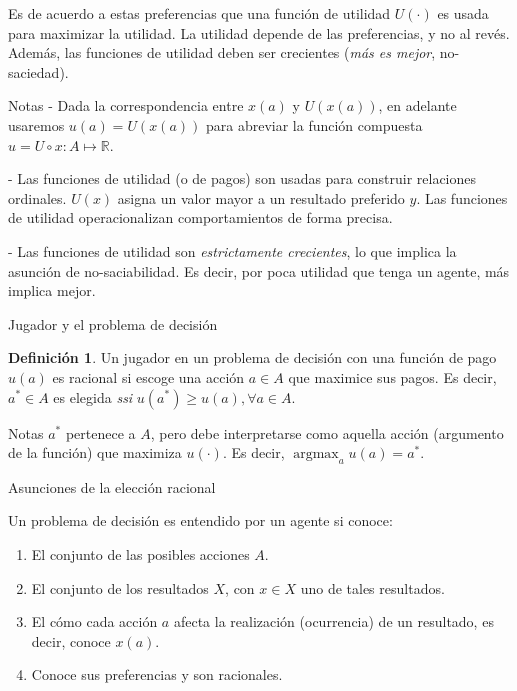 \documentclass[12pt]{scrartcl}
\theoremstyle{definition}
\newtheorem{defi}{Definición}[section]
\DeclareMathOperator*{\argmax}{argmax}
\newenvironment{myenum}
{ \begin{enumerate}
		\setlength{\itemsep}{0pt}
		\setlength{\parskip}{0pt}
		\setlength{\parsep}{0pt}     }
	{ \end{enumerate}                  }
\begin{document}
Es de acuerdo a estas preferencias que una función de utilidad $U(\cdot)$ es usada para maximizar la utilidad. La utilidad depende de las preferencias, y no al revés. Además, las funciones de utilidad deben ser crecientes (\textit{más es mejor}, no-saciedad).

\begin{summarybox}[colback=red!15]{Notas}
- Dada la correspondencia entre $x(a)$ y $U(x(a))$, en adelante usaremos $u(a)=U(x(a))$ para abreviar la función compuesta $u=U \circ x\colon A \mapsto \mathbb{R}$.

- Las funciones de utilidad (o de pagos) son usadas para construir relaciones ordinales. $U(x)$ asigna un valor mayor a un resultado preferido $y$. Las funciones de utilidad operacionalizan comportamientos de forma precisa. 

- Las funciones de utilidad son \textit{estrictamente crecientes}, lo que implica la asunción de no-saciabilidad. Es decir, por poca utilidad que tenga un agente, más implica mejor.
\end{summarybox}



\begin{mybox}{Jugador y el problema de decisión}
	\begin{defi}
		Un jugador en un problema de decisión con una función de pago $u(a)$ es racional si escoge una acción $a\in A$ que maximice sus pagos. Es decir, $a^* \in A$ es elegida \textit{ssi} $u(a^*)\geq u(a), \forall a\in A$.

	\end{defi}

\end{mybox}

\begin{summarybox}[colback=red!15]{Notas}
$a^*$ pertenece a $A$, pero debe interpretarse como aquella acción (argumento de la función) que maximiza $u(\cdot)$. Es decir, $\argmax_a u(a) = a^*$.

\end{summarybox}

\begin{mybox}{Asunciones de la elección racional}

Un problema de decisión es entendido por un agente si conoce:
    \begin{myenum}
        \item El conjunto de las posibles acciones $A$.
        \item El conjunto de los resultados $X$, con $x\in X$ uno de tales resultados.
        \item El cómo cada acción $a$ afecta la realización (ocurrencia) de un resultado, es decir, conoce $x(a)$.
        \item Conoce sus preferencias y son racionales.
    \end{myenum}
\end{mybox}
\end{document}
